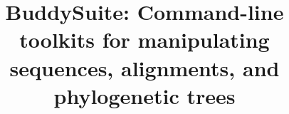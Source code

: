 \documentclass[twocolumn]{bmcart}%
\begin{document}
\begin{frontmatter}

\begin{fmbox}


\title{BuddySuite: Command-line toolkits for manipulating sequences, alignments, and phylogenetic trees}


\author[
   addressref={aff1},                    %
]{ }
\author[
   addressref={aff1},
]{ }
\author[
   addressref={aff1},
]{ }
\author[
   addressref={aff1},
   email={andy@mail.nih.gov}   
]{ }

\address[id=aff1]{%
  ,
  ,                     %
  ,                             %
  ,
}


\end{fmbox}
\end{frontmatter}
\end{document}
